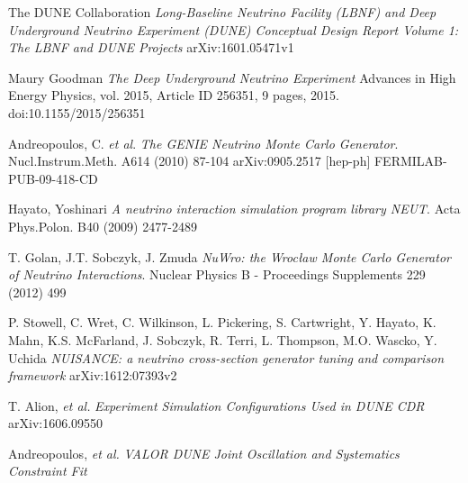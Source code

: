 \documentclass[12pt]{article}
\begin{document}
\begin{thebibliography}{7}

The DUNE Collaboration
\textit{Long-Baseline Neutrino Facility (LBNF) and Deep Underground Neutrino Experiment (DUNE) Conceptual Design Report Volume 1: The LBNF and DUNE Projects}
arXiv:1601.05471v1

Maury Goodman
\textit{The Deep Underground Neutrino Experiment}
Advances in High Energy Physics, vol. 2015, Article ID 256351, 9 pages, 2015. doi:10.1155/2015/256351

Andreopoulos, C. \textit{et al}.
\textit{The GENIE Neutrino Monte Carlo Generator}.
Nucl.Instrum.Meth. A614 (2010) 87-104 arXiv:0905.2517 [hep-ph] FERMILAB-PUB-09-418-CD

Hayato, Yoshinari 
\textit{A neutrino interaction simulation program library NEUT}.
Acta Phys.Polon. B40 (2009) 2477-2489

T. Golan, J.T. Sobczyk, J. Zmuda
\textit{NuWro: the Wrocław Monte Carlo Generator of Neutrino Interactions}.
Nuclear Physics B - Proceedings Supplements 229 (2012) 499

P. Stowell, C. Wret, C. Wilkinson, L. Pickering, S. Cartwright, Y. Hayato, K. Mahn, K.S. McFarland, J. Sobczyk, R. Terri, L. Thompson, M.O. Wascko, Y. Uchida
\textit{NUISANCE: a neutrino cross-section generator tuning and comparison framework}
arXiv:1612:07393v2

T. Alion, \textit{et al.}
\textit{Experiment Simulation Configurations Used in DUNE CDR}
arXiv:1606.09550

Andreopoulos, \textit{et al.}
\textit{VALOR DUNE Joint Oscillation and Systematics Constraint Fit}


\end{thebibliography}
\end{document}
